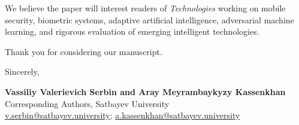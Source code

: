\documentclass[11pt]{article}
\begin{document}
We believe the paper will interest readers of \emph{Technologies} working on mobile security, biometric systems, adaptive artificial intelligence, adversarial machine learning, and rigorous evaluation of emerging intelligent technologies.

Thank you for considering our manuscript.

Sincerely,

\textbf{Vassiliy Valerievich Serbin and Aray Meyrambaykyzy Kassenkhan}\\
Corresponding Authors, Satbayev University\\
\href{mailto:v.serbin@satbayev.university}{v.serbin@satbayev.university}; \href{mailto:a.kassenkhan@satbayev.university}{a.kassenkhan@satbayev.university}
\end{document}
